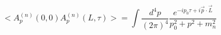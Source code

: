 \begin{equation}
<A_p^{(n)}(0,0)A_p^{(n)}(L,\tau)>=\int
\frac{d^4p}{(2\pi)^4}\frac{e^{-ip_0\tau +i\vec p \cdot \vec 
L}}{p_0^2+p^2+m_n^2}
\end{equation}

